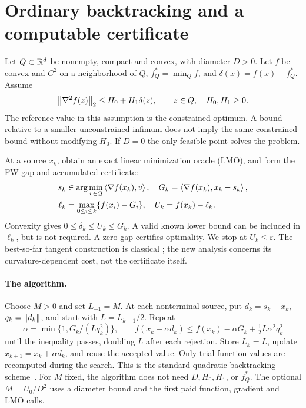 \section{Ordinary backtracking and a computable certificate}
\label{sec:model}
Let $Q\subset\mathbb R^d$ be nonempty, compact and convex, with diameter
$D>0$. Let $f$ be convex and $C^2$ on a neighborhood of $Q$,
$f_Q^*=\min_Q f$, and $\delta(x)=f(x)-f_Q^*$. Assume
\begin{equation}\label{eq:curvature}
 \left\|\nabla^2f(z)\right\|_2\le H_0+H_1\delta(z),\qquad z\in Q,
 \quad H_0,H_1\ge0.
\end{equation}
The reference value in this assumption is the constrained optimum.
A bound relative to a smaller unconstrained infimum does not imply the
same constrained bound without modifying $H_0$.
If $D=0$ the only feasible point solves the problem.

At a source $x_k$, obtain an exact linear minimization oracle (LMO),
and form the FW gap and accumulated certificate:
\begin{align}
 s_k&\in\arg\min_{v\in Q}\left\langle\nabla f(x_k),v\right\rangle,\quad
 G_k=\left\langle\nabla f(x_k),x_k-s_k\right\rangle,\label{eq:gap}\\
 \ell_k&=\max_{0\le i\le k}\{f(x_i)-G_i\},\quad
 U_k=f(x_k)-\ell_k.\label{eq:certificate}
\end{align}
Convexity gives $0\le\delta_k\le U_k\le G_k$. A valid known lower
bound can be included in $\ell_k$, but is not required. A zero gap
certifies optimality. We stop at $U_k\le\varepsilon$.
The best-so-far tangent construction is classical
\cite[Method 1, maximization convention]{freundgrigas}; the new
analysis concerns its curvature-dependent cost, not the certificate itself.

\paragraph{The algorithm.}
Choose $M>0$ and set $L_{-1}=M$. At each nonterminal source, put
$d_k=s_k-x_k$, $q_k=\left\|d_k\right\|$, and start with $L=L_{k-1}/2$.
Repeat
\begin{equation}\label{eq:btstep}
 \alpha=\min\{1,G_k/(Lq_k^2)\},\qquad
 f(x_k+\alpha d_k)\le f(x_k)-\alpha G_k
                         +\tfrac12L\alpha^2q_k^2
\end{equation}
until the inequality passes, doubling $L$ after each rejection.
Store $L_k=L$, update $x_{k+1}=x_k+\alpha d_k$, and reuse the accepted
value. Only trial function values are recomputed during the search.
This is the standard quadratic backtracking scheme~\cite{pedregosa}.
For $M$ fixed, the algorithm does not need $D,H_0,H_1$, or $f_Q^*$.
The optional $M=U_0/D^2$ uses a diameter bound and the first paid
function, gradient and LMO calls.

